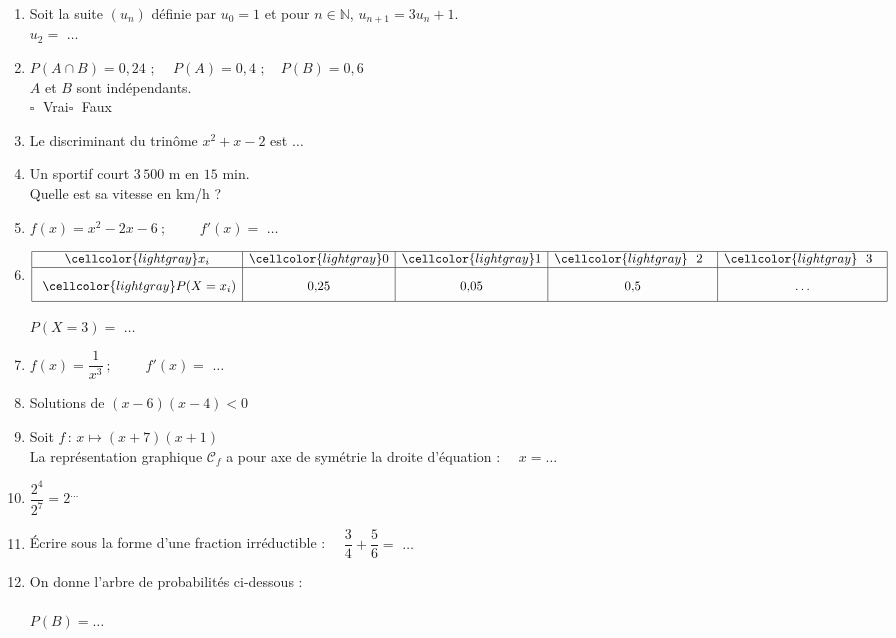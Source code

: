 \documentclass[a4paper,11pt,landscape,exos]{nsi} %
\begin{document}
\begin{multicols}{2}
\begin{enumerate}[]
\begin{tikzpicture}[baseline,scale = 0.6]
\end{tikzpicture}\\
	\item Soit la suite $(u_n)$ définie  par $u_0 = 1$ et pour $n \in \mathbb{N}$, 
    $u_{n+1} = 3u_n +1$.\\
    $u_2=$ $\ldots$
	\item $P(A\cap B)=0{,}24$ ; $\quad P(A)=0{,}4\,\,; \quad P(B)=0{,}6$\\$A$ et $B$ sont indépendants.\\	$\square\;$ Vrai\qquad $\square\;$ Faux\qquad 
	\item Le discriminant du trinôme $x^2+x-2$ est  $\ldots$
	\item Un sportif court $3\,500$ m  en $15$ min.\\
      Quelle est sa vitesse en km/h ?
	\item $f(x)=x^2-2x-6\ ; \qquad$
    $f'(x)=$ $\ldots$
	\item $\renewcommand{\arraystretch}{1}
\begin{array}{|c|c|c|c|c|}
\hline
\cellcolor{lightgray} x_i & \cellcolor{lightgray} 0 & \cellcolor{lightgray} 1 & \cellcolor{lightgray} \,\,\,\,2\,\,\,\, & \cellcolor{lightgray} \,\,\,\,3\,\,\,\,\\
\hline
 \rule[-2ex]{0pt} {6ex}\ \cellcolor{lightgray} P(X=x_i) & 0{,}25 & 0{,}05 & 0{,}5 & \ldots\\
\hline
 \end{array}
\renewcommand{\arraystretch}{1}$


\medskip
 $P(X=3)=$ $\ldots$
	\item $f(x)=\dfrac{1}{x^3}\ ;\qquad$
    $f'(x)=$ $\ldots$
	\item Solutions de $(x-6)(x-4)  < 0$
	\item Soit $f\,:\,x\longmapsto (x+7)(x+1) $\\
    La représentation graphique $\mathcal{C}_f$ a pour axe de symétrie la droite d’équation :	$\quad x=\ldots$
	\item $\dfrac{2^4}{2^7}=2^{\ldots}$
	\item Écrire sous la forme d'une fraction irréductible :
          $\quad \dfrac{3}{4} + \dfrac{5}{6}=$
              $\ldots$
	\item On donne l'arbre de probabilités ci-dessous :\\
    \def\abun{A}
 \def\alun{0,7}
 \def\abdeux{$\barmaj{A}$}
 \def\aldeux{}
 \def\abtrois{$B$}
 \def\altrois{0,2}
 \def\abquatre{$\barmaj{B}$}
 \def\alquatre{}
\def\abcinq{$B$}
 \def\alcinq{0,5}
 \def\absix{$\barmaj{B}$}
 \def\alsix{}
 \arbreproba\\
    $P(B)=\ldots$ 


\end{enumerate}
\end{multicols}
\end{document}
